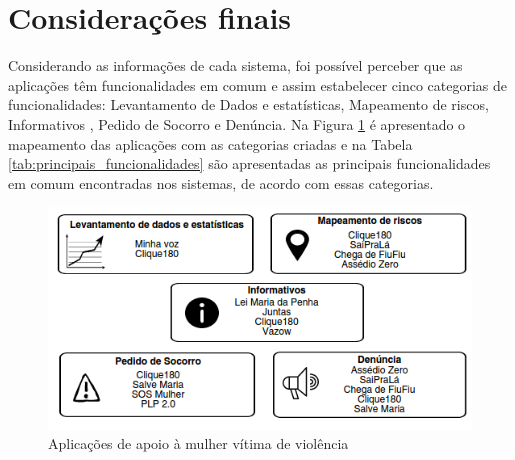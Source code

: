 


\section{Considerações finais}

Considerando as informações de cada sistema, foi possível perceber que as aplicações têm funcionalidades
em comum e assim estabelecer cinco categorias de funcionalidades: Levantamento de Dados e estatísticas, Mapeamento de riscos, 
Informativos , Pedido de Socorro e Denúncia. Na Figura \ref{fig:sistemas_categorizados} é apresentado o mapeamento das aplicações com as categorias criadas e na 
Tabela \ref{tab:principais_funcionalidades} são apresentadas as principais funcionalidades em comum encontradas nos sistemas, 
de acordo com essas categorias.

\begin{figure}[h!]
\centering
\includegraphics[scale=0.75]{figuras/sistemas_relacionados.png}
\caption{Aplicações de apoio à mulher vítima de violência}
\label{fig:sistemas_categorizados}
\end{figure}

